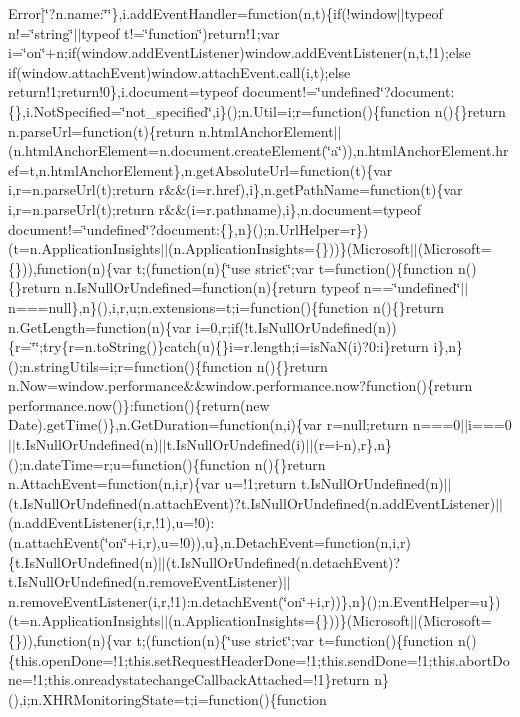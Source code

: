 Error\mbox{]}\char`\"{}?n.\+name\+:\char`\"{}\char`\"{}\},i.\+add\+Event\+Handler=function(n,t)\{if(!window$\vert$$\vert$typeof n!=\char`\"{}string\char`\"{}$\vert$$\vert$typeof t!=\char`\"{}function\char`\"{})return!1;var i=\char`\"{}on\char`\"{}+n;if(window.\+add\+Event\+Listener)window.\+add\+Event\+Listener(n,t,!1);else if(window.\+attach\+Event)window.\+attach\+Event.\+call(i,t);else return!1;return!0\},i.\+document=typeof document!=\char`\"{}undefined\char`\"{}?document\+:\{\},i.\+Not\+Specified=\char`\"{}not\+\_\+specified\char`\"{},i\}();n.\+Util=i;r=function()\{function n()\{\}return n.\+parse\+Url=function(t)\{return n.\+html\+Anchor\+Element$\vert$$\vert$(n.\+html\+Anchor\+Element=n.\+document.\+create\+Element(\char`\"{}a\char`\"{})),n.\+html\+Anchor\+Element.\+href=t,n.\+html\+Anchor\+Element\},n.\+get\+Absolute\+Url=function(t)\{var i,r=n.\+parse\+Url(t);return r\&\&(i=r.\+href),i\},n.\+get\+Path\+Name=function(t)\{var i,r=n.\+parse\+Url(t);return r\&\&(i=r.\+pathname),i\},n.\+document=typeof document!=\char`\"{}undefined\char`\"{}?document\+:\{\},n\}();n.\+Url\+Helper=r\})(t=n.\+Application\+Insights$\vert$$\vert$(n.\+Application\+Insights=\{\}))\}(\+Microsoft$\vert$$\vert$(\+Microsoft=\{\})),function(n)\{var t;(function(n)\{\char`\"{}use strict\char`\"{};var t=function()\{function n()\{\}return n.\+Is\+Null\+Or\+Undefined=function(n)\{return typeof n==\char`\"{}undefined\char`\"{}$\vert$$\vert$n===null\},n\}(),i,r,u;n.\+extensions=t;i=function()\{function n()\{\}return n.\+Get\+Length=function(n)\{var i=0,r;if(!t.\+Is\+Null\+Or\+Undefined(n))\{r=\char`\"{}\char`\"{};try\{r=n.\+to\+String()\}catch(u)\{\}i=r.\+length;i=is\+Na\+N(i)?0\+:i\}return i\},n\}();n.\+string\+Utils=i;r=function()\{function n()\{\}return n.\+Now=window.\+performance\&\&window.\+performance.\+now?function()\{return performance.\+now()\}\+:function()\{return(new Date).\+get\+Time()\},n.\+Get\+Duration=function(n,i)\{var r=null;return n===0$\vert$$\vert$i===0$\vert$$\vert$t.\+Is\+Null\+Or\+Undefined(n)$\vert$$\vert$t.\+Is\+Null\+Or\+Undefined(i)$\vert$$\vert$(r=i-\/n),r\},n\}();n.\+date\+Time=r;u=function()\{function n()\{\}return n.\+Attach\+Event=function(n,i,r)\{var u=!1;return t.\+Is\+Null\+Or\+Undefined(n)$\vert$$\vert$(t.\+Is\+Null\+Or\+Undefined(n.\+attach\+Event)?t.\+Is\+Null\+Or\+Undefined(n.\+add\+Event\+Listener)$\vert$$\vert$(n.\+add\+Event\+Listener(i,r,!1),u=!0)\+:(n.\+attach\+Event(\char`\"{}on\char`\"{}+i,r),u=!0)),u\},n.\+Detach\+Event=function(n,i,r)\{t.\+Is\+Null\+Or\+Undefined(n)$\vert$$\vert$(t.\+Is\+Null\+Or\+Undefined(n.\+detach\+Event)?t.\+Is\+Null\+Or\+Undefined(n.\+remove\+Event\+Listener)$\vert$$\vert$n.\+remove\+Event\+Listener(i,r,!1)\+:n.\+detach\+Event(\char`\"{}on\char`\"{}+i,r))\},n\}();n.\+Event\+Helper=u\})(t=n.\+Application\+Insights$\vert$$\vert$(n.\+Application\+Insights=\{\}))\}(\+Microsoft$\vert$$\vert$(\+Microsoft=\{\})),function(n)\{var t;(function(n)\{\char`\"{}use strict\char`\"{};var t=function()\{function n()\{this.\+open\+Done=!1;this.\+set\+Request\+Header\+Done=!1;this.\+send\+Done=!1;this.\+abort\+Done=!1;this.\+onreadystatechange\+Callback\+Attached=!1\}return n\}(),i;n.\+X\+H\+R\+Monitoring\+State=t;i=function()\{function 